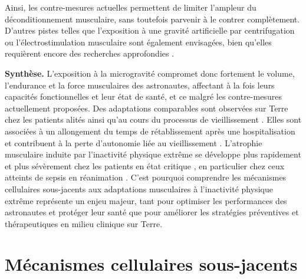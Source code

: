\documentclass[11pt]{report}
\begin{document}
Ainsi, les contre-mesures actuelles permettent de limiter l'ampleur du déconditionnement musculaire, sans toutefois parvenir à le contrer complètement. D'autres pistes telles que l'exposition à une gravité artificielle par centrifugation ou l'électrostimulation musculaire sont également envisagées, bien qu'elles requièrent encore des recherches approfondies \parencite{bosutti_microgravity-induced_2025}.
 
\begin{tcolorbox}[colback=gray!3,colframe=gray!50, width=\textwidth]
	\textbf{Synthèse.} L'exposition à la microgravité compromet donc fortement le volume, l'endurance et la force musculaires des astronautes, affectant à la fois leurs capacités fonctionnelles et leur état de santé, et ce malgré les contre-mesures actuellement proposées. Des adaptations comparables sont observées sur Terre chez les patients alités \parencite{hardy_time_2022} ainsi qu'au cours du processus de vieillissement \parencite{raffin_sedentary_2023}. Elles sont associées à un allongement du temps de rétablissement après une hospitalisation \parencite{fuchs_muscle_2025} et contribuent à la perte d'autonomie liée au vieillissement \parencite{bosutti_microgravity-induced_2025}. L'atrophie musculaire induite par l'inactivité physique extrême se développe plus rapidement et plus sévèrement chez les patients en état critique \parencite{hardy_time_2022}, en particulier chez ceux atteints de sepsis en réanimation \parencite{Parry2015Oct}.
	C'est pourquoi comprendre les mécanismes cellulaires sous-jacents aux adaptations musculaires à l'inactivité physique extrême représente un enjeu majeur, tant pour optimiser les performances des astronautes et protéger leur santé que pour améliorer les stratégies préventives et thérapeutiques en milieu clinique sur Terre.
\end{tcolorbox}

\section{Mécanismes cellulaires sous-jacents}
\end{document}
